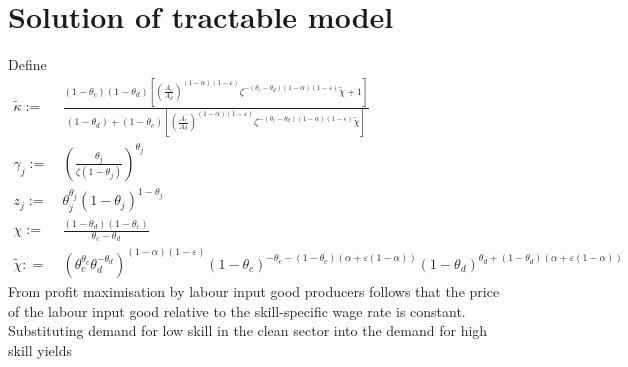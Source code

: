 \section{Solution of tractable model}\label{app:solu}
Define
\begin{align*}
	\tilde{\kappa}:=\ &\frac{(1-\theta_c)(1-\theta_d)\left[\left(\frac{A_c}{A_d}\right)^{(1-\alpha)(1-\varepsilon)}\zeta^{-(\theta_c-\theta_d)(1-\alpha)(1-\varepsilon)}\tilde{\chi}+1\right]}{(1-\theta_d)+(1-\theta_c)\left[\left(\frac{A_c}{A_d}\right)^{(1-\alpha)(1-\varepsilon)}\zeta^{-(\theta_c-\theta_d)(1-\alpha)(1-\varepsilon)}\tilde{\chi}\right]}\\
	\gamma_j:=\ & \left(\frac{\theta_j}{\zeta(1-\theta_j)}\right)^{\theta_j}\\
	z_j:=\ &\theta_j^{\theta_j}(1-\theta_j)^{1-\theta_j} \\
	\chi:=\ &%
	\frac{(1-\theta_d)(1-\theta_c)}{\theta_c-\theta_d}\\
	\tilde{\chi}: =\ &  (\theta_c^{\theta_c}\theta_d^{-\theta_d})^{(1-\alpha) (1-\varepsilon)}(1-\theta_c)^{-\theta_c-(1-\theta_c)(\alpha+\varepsilon(1-\alpha))}(1-\theta_d)^{\theta_d+(1-\theta_d)(\alpha+\varepsilon(1-\alpha))}
\end{align*}
From profit maximisation by labour input good producers follows that the price of the labour input good relative to the skill-specific wage rate is constant. Substituting demand for low skill in the clean sector into the demand for high skill yields

